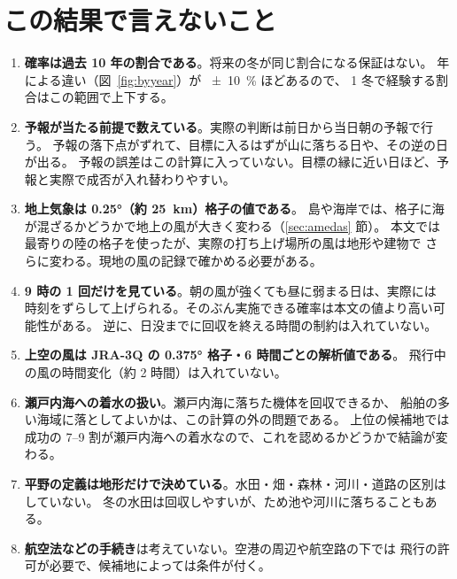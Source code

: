 \section{この結果で言えないこと}
\label{sec:limits}

\begin{enumerate}
  \item \textbf{確率は過去 10 年の割合である}。将来の冬が同じ割合になる保証はない。
    年による違い（図~\ref{fig:byyear}）が \SI{\pm 10}{\percent} ほどあるので、
    1 冬で経験する割合はこの範囲で上下する。
  \item \textbf{予報が当たる前提で数えている}。実際の判断は前日から当日朝の予報で行う。
    予報の落下点がずれて、目標に入るはずが山に落ちる日や、その逆の日が出る。
    予報の誤差はこの計算に入っていない。目標の縁に近い日ほど、予報と実際で成否が入れ替わりやすい。
  \item \textbf{地上気象は \ang{0.25}（約 \SI{25}{\kilo\metre}）格子の値である}。
    島や海岸では、格子に海が混ざるかどうかで地上の風が大きく変わる（\ref{sec:amedas} 節）。
    本文では最寄りの陸の格子を使ったが、実際の打ち上げ場所の風は地形や建物で
    さらに変わる。現地の風の記録で確かめる必要がある。
  \item \textbf{9 時の 1 回だけを見ている}。朝の風が強くても昼に弱まる日は、実際には
    時刻をずらして上げられる。そのぶん実施できる確率は本文の値より高い可能性がある。
    逆に、日没までに回収を終える時間の制約は入れていない。
  \item \textbf{上空の風は JRA-3Q の \ang{0.375} 格子・6 時間ごとの解析値である}。
    飛行中の風の時間変化（約 2 時間）は入れていない。
  \item \textbf{瀬戸内海への着水の扱い}。瀬戸内海に落ちた機体を回収できるか、
    船舶の多い海域に落としてよいかは、この計算の外の問題である。
    上位の候補地では成功の 7--9 割が瀬戸内海への着水なので、これを認めるかどうかで結論が変わる。
  \item \textbf{平野の定義は地形だけで決めている}。水田・畑・森林・河川・道路の区別はしていない。
    冬の水田は回収しやすいが、ため池や河川に落ちることもある。
  \item \textbf{航空法などの手続き}は考えていない。空港の周辺や航空路の下では
    飛行の許可が必要で、候補地によっては条件が付く。
\end{enumerate}

